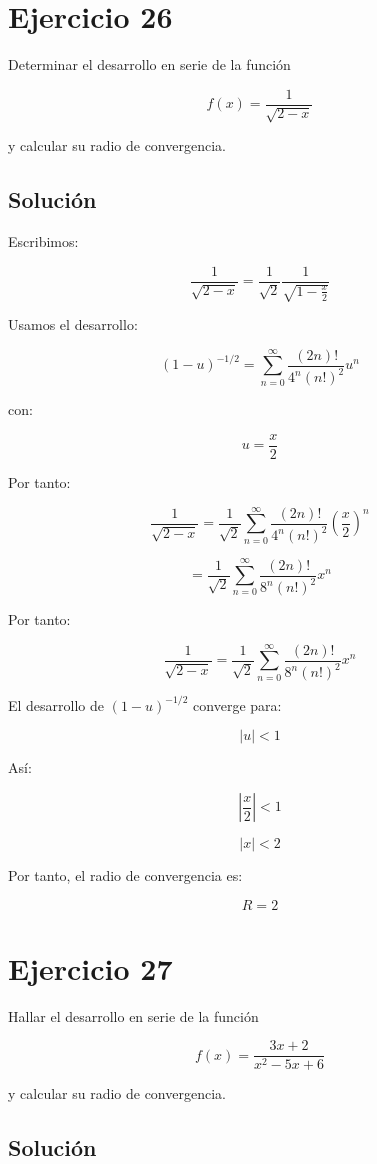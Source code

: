 \documentclass[fleqn]{article}
\begin{document}
\section{Ejercicio 26}
	Determinar el desarrollo en serie de la función

	\[
	f(x)=\frac{1}{\sqrt{2-x}}
	\]

	y calcular su radio de convergencia.

	\subsection{Solución}

	Escribimos:

	\[
	\frac{1}{\sqrt{2-x}}
	=
	\frac{1}{\sqrt{2}}
	\frac{1}{\sqrt{1-\frac{x}{2}}}
	\]

	Usamos el desarrollo:

	\[
	(1-u)^{-1/2}
	=
	\sum_{n=0}^{\infty}
	\frac{(2n)!}{4^n(n!)^2}u^n
	\]

	con:

	\[
	u=\frac{x}{2}
	\]

	Por tanto:

	\[
	\frac{1}{\sqrt{2-x}}
	=
	\frac{1}{\sqrt{2}}
	\sum_{n=0}^{\infty}
	\frac{(2n)!}{4^n(n!)^2}
	\left(
	\frac{x}{2}
	\right)^n
	\]

	\[
	=
	\frac{1}{\sqrt{2}}
	\sum_{n=0}^{\infty}
	\frac{(2n)!}{8^n(n!)^2}x^n
	\]

	Por tanto:

	\[
	\boxed{
	\frac{1}{\sqrt{2-x}}
	=
	\frac{1}{\sqrt{2}}
	\sum_{n=0}^{\infty}
	\frac{(2n)!}{8^n(n!)^2}x^n
	}
	\]

	El desarrollo de $(1-u)^{-1/2}$ converge para:

	\[
	|u|<1
	\]

	Así:

	\[
	\left|
	\frac{x}{2}
	\right|<1
	\]

	\[
	|x|<2
	\]

	Por tanto, el radio de convergencia es:

	\[
	\boxed{
	R=2
	}
	\]

\section{Ejercicio 27}
	Hallar el desarrollo en serie de la función

	\[
	f(x)=\frac{3x+2}{x^2-5x+6}
	\]

	y calcular su radio de convergencia.

	\subsection{Solución}
\end{document}
